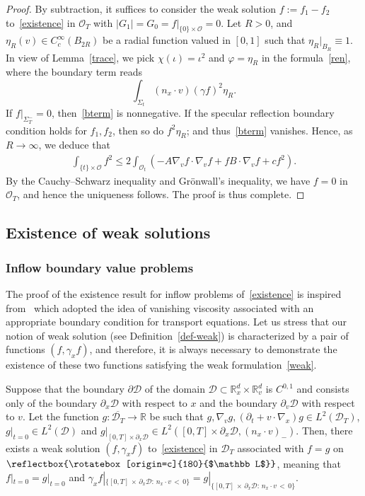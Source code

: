 \documentclass[AHL,Unicode,longabstracts,published]{cedram}
\newcommand*\p{\partial}
\newcommand*\R {\mathbb{R}}
\newcommand*\D {\mathcal{D}}
\newcommand*\OO {\mathcal{O}}
\newcommand\GG{\reflectbox{\rotatebox[origin=c]{180}{$\mathbb L$}}}
\begin{document}
\begin{proof}
By subtraction, it suffices to consider the weak solution $f:=f_1-f_2$ to~\eqref{existence} in $\OO_T$ with $|G_1|=G_0=f|_{\{0\}\times\OO}=0$. Let $R>0$, and $\eta_R(v)\in C_c^\infty(B_{2R})$ be a radial function valued in $[0,1]$ such that $\eta_R|_{B_R}\equiv1$. In view of Lemma~\ref{trace}, we pick $\chi(\iota)=\iota^2$ and $\varphi=\eta_R$ in the formula~\eqref{ren}, where the boundary term reads
\begin{equation}\label{bterm}
\int_{\Sigma_t} (n_x\cdot v) (\gamma f)^2\eta_R.
\end{equation}
If $f|_{\Sigma_T^-}=0$, then~\eqref{bterm} is nonnegative. If the specular reflection boundary condition holds for $f_1,f_2$, then so do $f^2\eta_R$; and thus~\eqref{bterm} vanishes. Hence, as $R\rightarrow\infty$, we deduce that
\begin{align*}
\int_{\{t\}\times\OO}f^2 \le 2\int_{\OO_t}\left(-A\nabla_vf\cdot\nabla_vf +fB\cdot\nabla_vf +cf^2\right).
\end{align*}
By the Cauchy--Schwarz inequality and Gr\"onwall's inequality, we have $f=0$ in $\OO_T$, and hence the uniqueness follows. The proof is thus complete.
\end{proof}

\subsection{Existence of weak solutions}\label{EW}
\subsubsection{Inflow boundary value problems}\label{subinflow}


The proof of the existence result for inflow problems of~\eqref{existence} is inspired from~\cite{Boyer} which adopted the idea of vanishing viscosity associated with an appropriate boundary condition for transport equations. Let us stress that our notion of weak solution (see Definition~\ref{def-weak}) is characterized by a pair of functions $(f,\gamma_xf)$, and therefore, it is always necessary to demonstrate the existence of these two functions satisfying the weak formulation~\eqref{weak}.

\begin{lemm}\label{weakexistence}
Suppose that the boundary $\p\D$ of the domain $\D\subset\R^d_x\times\R^d_v$ is $C^{0,1}$ and consists only of the boundary $\p_x\D$ with respect to $x$ and the boundary $\p_v\D$ with respect to $v$. Let the function $g:\overline{\D_T}\rightarrow\R$ be such that $g,\nabla_vg,(\p_t+v\cdot\nabla_x)g\in L^2(\D_T)$, $g|_{t=0}\in L^2(\D)$ and $g|_{[0,T]\times\p_x\D}\in L^2([0,T]\times\p_x\D,(n_x\cdot v)_-)$. Then, there exists a weak solution $(f,\gamma_x f)$ to~\eqref{existence} in $\D_T$ associated with $f=g$ on $\GG$, meaning that $f|_{t=0}=g|_{t=0}$ and $\gamma_xf|_{\{[0,T]\,\times\,\p_x\D:\,n_x\cdot v\,<\,0\}}=g|_{\{[0,T]\,\times\,\p_x\D:\,n_x\cdot v\,<\,0\}}$.
\end{lemm}
\end{document}
